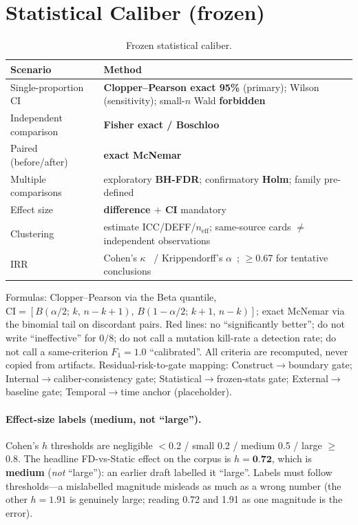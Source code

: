 \documentclass{article}
\begin{document}
\section{Statistical Caliber (frozen)}
\label{app:stats}
\begin{table}[h]
\caption{Frozen statistical caliber.}
\centering
\small
\begin{tabular}{@{}lp{9.5cm}@{}}
\toprule
Scenario & Method \\
\midrule
Single-proportion CI & \textbf{Clopper--Pearson exact 95\%} (primary); Wilson (sensitivity); small-$n$ Wald \textbf{forbidden} \\
Independent comparison & \textbf{Fisher exact / Boschloo} \\
Paired (before/after) & \textbf{exact McNemar} \\
Multiple comparisons & exploratory \textbf{BH-FDR}; confirmatory \textbf{Holm}; family pre-defined \\
Effect size & \textbf{difference $+$ CI} mandatory \\
Clustering & estimate ICC/DEFF/$n_{\text{eff}}$; same-source cards $\neq$ independent observations \\
IRR & Cohen's $\kappa$~\cite{cohen1960coefficient} / Krippendorff's $\alpha$~\cite{krippendorff1980content}; $\ge$0.67 for tentative conclusions \\
\bottomrule
\end{tabular}
\end{table}
Formulas: Clopper--Pearson via the Beta quantile,
$\text{CI}=[B(\alpha/2;\,k,\,n{-}k{+}1),\,B(1{-}\alpha/2;\,k{+}1,\,n{-}k)]$; exact McNemar via the
binomial tail on discordant pairs. Red lines: no ``significantly better''; do not write
``ineffective'' for $0/8$; do not call a mutation kill-rate a detection rate; do not call a
same-criterion $F_1{=}1.0$ ``calibrated''. All criteria are recomputed, never copied from
artifacts. Residual-risk-to-gate mapping: Construct$\to$boundary gate; Internal$\to$caliber-consistency
gate; Statistical$\to$frozen-stats gate; External$\to$baseline gate; Temporal$\to$time anchor (placeholder).

\paragraph{Effect-size labels (\textbf{medium}, not ``large'').} Cohen's $h$ thresholds are
negligible $<$0.2 / small 0.2 / medium 0.5 / large $\ge$0.8. The headline FD-vs-Static effect
on the corpus is $h=\textbf{0.72}$, which is \textbf{medium} (\emph{not} ``large''): an earlier draft
labelled it ``large''. Labels must follow thresholds---a mislabelled magnitude misleads as much as a
wrong number (the other $h=1.91$ is genuinely large; reading 0.72 and 1.91 as one magnitude is the error).
\end{document}
